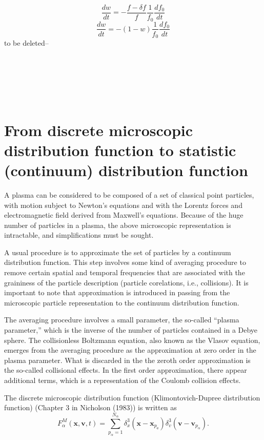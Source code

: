 \documentclass{article}
\begin{document}
\begin{equation}
  \frac{d w}{d t} = - \frac{f - \delta f}{f}  \frac{1}{f_0}  \frac{d f_0}{d t}
\end{equation}
\begin{equation}
  \frac{d w}{d t} = - (1 - w)  \frac{1}{f_0}  \frac{d f_0}{d t}
\end{equation}
to be deleted--

\

\

\

\appendix\section{From discrete microscopic distribution function to
statistic (continuum) distribution function}

A plasma can be considered to be composed of a set of classical point
particles, with motion subject to Newton's equations and with the Lorentz
forces and electromagnetic field derived from Maxwell's equations. Because of
the huge number of particles in a plasma, the above microscopic representation
is intractable, and simplifications must be sought{\cite{turner2006}}.

A usual procedure is to approximate the set of particles by a continuum
distribution function. This step involves some kind of averaging procedure to
remove certain spatial and temporal frequencies that are associated with the
graininess of the particle description (particle corelations, i.e.,
collisions). It is important to note that approximation is introduced in
passing from the microscopic particle representation to the continuum
distribution function.

The averaging procedure involves a small parameter, the so-called ``plasma
parameter,'' which is the inverse of the number of particles contained in a
Debye sphere. The collisionless Boltzmann equation, also known as the Vlasov
equation, emerges from the averaging procedure as the approximation at zero
order in the plasma parameter. What is discarded in the the zeroth order
approximation is the so-called collisional effects. In the first order
approximation, there appear additional terms, which is a representation of the
Coulomb collision effects.

The discrete microscopic distribution function (Klimontovich-Dupree
distribution function) (Chapter 3 in Nicholson (1983)) is written as
\begin{equation}
  F^M_{\alpha} (\mathbf{x}, \mathbf{v}, t) = \sum_{p_{\alpha} =
  1}^{N_{\alpha}} \delta_x^3 (\mathbf{x}-\mathbf{x}_{p_a}) \delta^3_v
  (\mathbf{v}-\mathbf{v}_{p_{\alpha}}) .
\end{equation}
\end{document}
